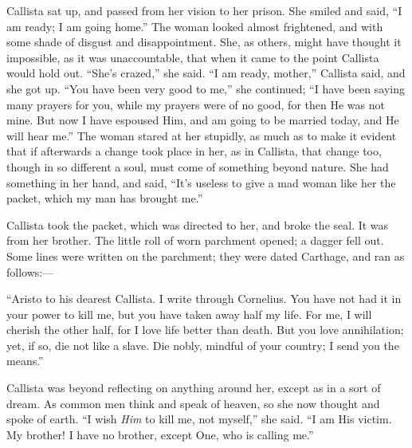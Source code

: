 Callista sat up, and passed from her vision to her prison. She
smiled and said, ``I am ready; I am going home.'' The woman
looked almost frightened, and with some shade of disgust and
disappointment. She, as others, might have thought it impossible, as
it was unaccountable, that when it came to the point Callista would
hold out. ``She's crazed,'' she said. ``I am ready,
mother,'' Callista said, and she got up. ``You have been very
good to me,'' she continued; ``I have been saying many prayers
for you, while my prayers were of no good, for then He was not mine.
But now I have espoused Him, and am going to be married today, and He
will hear me.'' The woman stared at her stupidly, as much as
to make it evident that if afterwards a change took place in her, as
in Callista, that change too, though in so different a soul, must come
of something beyond nature. She had something in her hand, and said,
``It's useless to give a mad woman like her the packet, which my
man has brought me.''

Callista took the packet, which was directed to her, and broke the
seal. It was from her brother. The little roll of worn parchment
opened; a dagger fell out. Some lines were written on the parchment;
they were dated Carthage, and ran as follows:—

``Aristo to his dearest Callista. I write through Cornelius.
You have not had it in your power to kill me, but you have taken away
half my life. For me, I will cherish the other half, for I love life
better than death. But you love annihilation; yet, if so, die not like
a slave. Die nobly, mindful of your country; I send you the
means.''

Callista was beyond reflecting on anything around her, except as in
a sort of dream. As common men think and speak of heaven, so she now
thought and spoke of earth. ``I wish \emph{Him} to kill me, not
myself,'' she said. ``I am His victim. My brother! I have no
brother, except One, who is calling me.''

